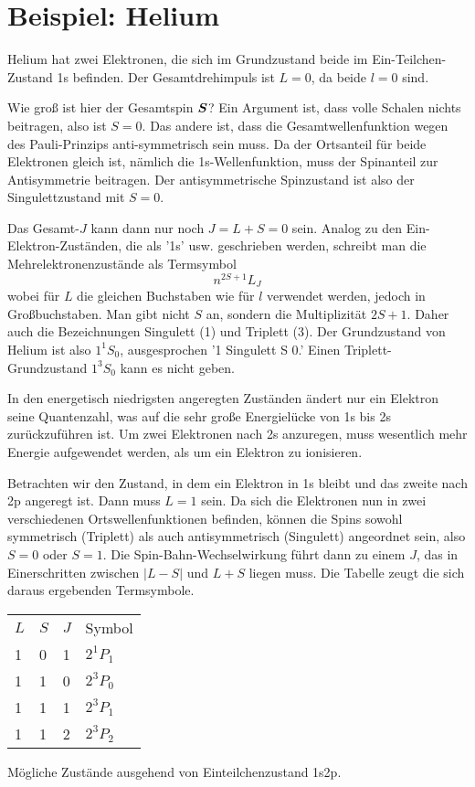 \section{Beispiel: Helium}

Helium hat zwei Elektronen, die sich im Grundzustand beide im Ein-Teilchen-Zustand 1s befinden. Der Gesamtdrehimpuls ist $L=0$, da beide $l=0$ sind.

Wie groß ist hier der Gesamtspin $\boldsymbol{S}$? Ein Argument ist, dass volle Schalen nichts beitragen, also ist $S=0$. Das andere ist, dass die Gesamtwellenfunktion wegen des Pauli-Prinzips anti-symmetrisch sein muss. Da der Ortsanteil für beide Elektronen gleich ist, nämlich die 1s-Wellenfunktion, muss der Spinanteil zur Antisymmetrie beitragen. Der antisymmetrische Spinzustand ist also der Singulettzustand mit $S=0$.

Das Gesamt-$J$ kann dann nur noch $J  = L + S = 0$ sein.  Analog zu den Ein-Elektron-Zuständen, die als '1s' usw. geschrieben werden, schreibt man die Mehrelektronenzustände als Termsymbol
\begin{equation}
    n^{2S + 1}L_{J}
\end{equation}
wobei für $L$ die gleichen Buchstaben wie für $l$ verwendet werden, jedoch in Großbuchstaben. Man gibt nicht $S$ an, sondern die Multiplizität $2S+1$. Daher auch die Bezeichnungen Singulett (1) und Triplett (3). Der Grundzustand von Helium ist
also $1^1S_0$,  ausgesprochen '1 Singulett S 0.'  Einen Triplett-Grundzustand $1^3S_0$ kann es nicht geben.

In den energetisch niedrigsten angeregten Zuständen ändert nur ein Elektron seine Quantenzahl, was auf die sehr große Energielücke von 1s bis 2s zurückzuführen ist. Um zwei Elektronen nach 2s anzuregen, muss wesentlich mehr Energie aufgewendet werden, als um ein Elektron zu ionisieren.

Betrachten wir den Zustand, in dem ein Elektron in 1s bleibt und das zweite nach 2p angeregt ist. Dann muss $L=1$ sein. Da sich die Elektronen nun in zwei verschiedenen Ortswellenfunktionen befinden, können die Spins sowohl symmetrisch (Triplett) als auch antisymmetrisch (Singulett) angeordnet sein, also $S=0$ oder $S=1$. Die Spin-Bahn-Wechselwirkung führt dann zu einem $J$, das in Einerschritten zwischen $|L - S|$ und $L+S$ liegen muss. Die Tabelle zeugt die sich daraus ergebenden Termsymbole.

\begin{marginfigure}
   \begin{tabular}{llll}
    $L$ & $S$ & $J$ & Symbol \\
    1   & 0  &  1 & $2^1P_1$ \\
    1   & 1 &  0 & $2^3P_0$ \\
    1   & 1  &  1 & $2^3P_1$ \\
    1   & 1  &  2 & $2^3P_2$ \\
\end{tabular} 
\vspace*{2mm}

\caption{Mögliche Zustände ausgehend von Einteilchenzustand 1s2p.}
\end{marginfigure}

